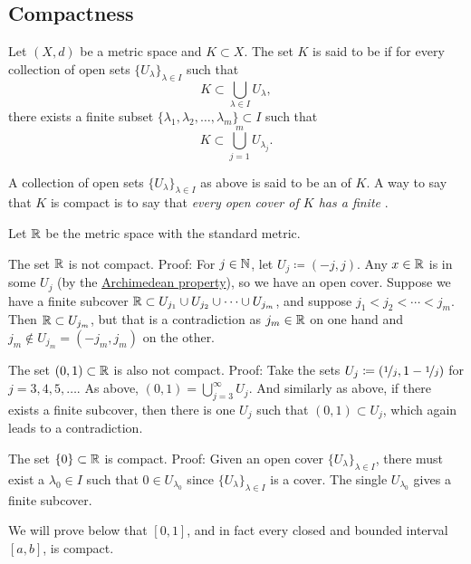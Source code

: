\subsection{Compactness}

\begin{defn}
Let $(X,d)$ be a metric space and $K \subset X$. 
The set $K$ is said to be \emph{}
if for every collection
of open sets $\{ U_{\lambda} \}_{\lambda \in I}$ such that
\begin{equation*}
K \subset \bigcup_{\lambda \in I} U_\lambda ,
\end{equation*}
there exists a finite subset
$\{ \lambda_1, \lambda_2,\ldots,\lambda_m \} \subset I$
such that
\begin{equation*}
K \subset \bigcup_{j=1}^m U_{\lambda_j} .
\end{equation*}
\end{defn}

A collection of open sets $\{ U_{\lambda} \}_{\lambda \in I}$ as above is
said to be an \emph{} of $K$.  A way to say that
$K$ is compact is to say that \emph{every open cover of $K$ has a finite
}.

\begin{example}
Let ${\mathbb{R}}$ be the metric space with the standard metric.

The set ${\mathbb{R}}$ is not compact.  Proof: For $j \in {\mathbb{N}}$, let $U_j \coloneqq (-j,j)$.
Any $x \in {\mathbb{R}}$ is in some $U_j$ (by the
\hyperref[thm:arch:i]{Archimedean property}), so we have an open cover.
Suppose we have a finite
subcover ${\mathbb{R}} \subset U_{j_1} \cup U_{j_2} \cup \cdots \cup U_{j_m}$,
and suppose $j_1 < j_2 < \cdots < j_m$.  Then ${\mathbb{R}} \subset U_{j_m}$, but that is
a contradiction as $j_m \in {\mathbb{R}}$ on one hand and $j_m \notin U_{j_m} =
(-j_m,j_m)$ on the
other.

The set $(0,1) \subset {\mathbb{R}}$ is also not compact.  Proof:  Take the 
sets $U_{j} \coloneqq (\nicefrac{1}{j},1-\nicefrac{1}{j})$ for $j=3,4,5,\ldots$.
As above, $(0,1) = \bigcup_{j=3}^\infty U_j$.  And similarly as above,
if there exists a finite subcover, then there is one $U_j$ such that $(0,1)
\subset U_j$, which again leads to a contradiction.

The set $\{ 0 \} \subset {\mathbb{R}}$ is compact.  Proof: Given an open cover $\{
U_{\lambda} \}_{\lambda \in I}$, there must exist a $\lambda_0 \in I$ such that $0
\in U_{\lambda_0}$
since $\{ U_{\lambda} \}_{\lambda \in I}$ is a cover.
The single $U_{\lambda_0}$ gives a
finite subcover.

We will prove below that $[0,1]$, and in fact every closed and bounded
interval $[a,b]$, is compact.
\end{example}

